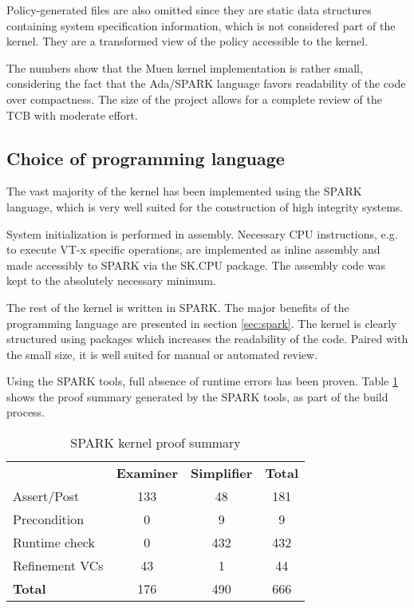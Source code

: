 Policy-generated files are also omitted since they are static data structures
containing system specification information, which is not considered part of the
kernel. They are a transformed view of the policy accessible to the kernel.

The numbers show that the Muen kernel implementation is rather small,
considering the fact that the Ada/SPARK language favors readability of the code
over compactness. The size of the project allows for a complete review of the
TCB with moderate effort.

\subsection{Choice of programming language}
The vast majority of the kernel has been implemented using the SPARK language,
which is very well suited for the construction of high integrity systems.

System initialization is performed in assembly. Necessary CPU instructions,
e.g. to execute VT-x specific operations, are implemented as inline assembly
and made accessibly to SPARK via the SK.CPU package. The assembly code was
kept to the absolutely necessary minimum.

The rest of the kernel is written in SPARK. The major benefits of the
programming language are presented in section \ref{sec:spark}. The kernel is
clearly structured using packages which increases the readability of the code.
Paired with the small size, it is well suited for manual or automated review.

Using the SPARK tools, full absence of runtime errors has been proven. Table
\ref{tab:kernel-proof-sum} shows the proof summary generated by the SPARK tools,
as part of the build process.

\begin{table}[h]
	\centering
	\begin{tabular}{l c c c}
		& \textbf{Examiner} & \textbf{Simplifier} & \textbf{Total} \\
		Assert/Post    & 133 & 48  & 181 \\
		Precondition   & 0   & 9   & 9   \\
		Runtime check  & 0   & 432 & 432 \\
		Refinement VCs & 43  & 1   & 44 \\
		\hline
		\textbf{Total} & 176 & 490 & 666 \\
	\end{tabular}
	\caption{SPARK kernel proof summary}
	\label{tab:kernel-proof-sum}
\end{table}

